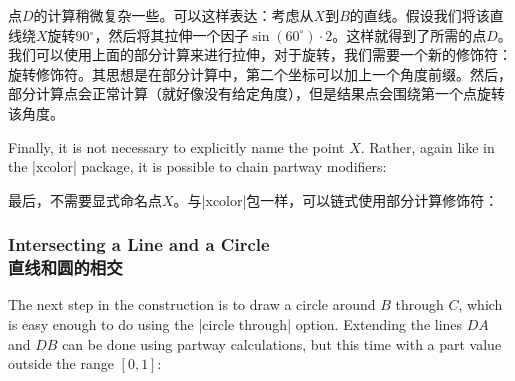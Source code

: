 点$D$的计算稍微复杂一些。可以这样表达：考虑从$X$到$B$的直线。假设我们将该直线绕$X$旋转90$^\circ$，然后将其拉伸一个因子$\sin(60^\circ) \cdot 2$。这样就得到了所需的点$D$。我们可以使用上面的部分计算来进行拉伸，对于旋转，我们需要一个新的修饰符：旋转修饰符。其思想是在部分计算中，第二个坐标可以加上一个角度前缀。然后，部分计算点会正常计算（就好像没有给定角度），但是结果点会围绕第一个点旋转该角度。

\begin{codeexample}[preamble={\usetikzlibrary{calc}}]
\end{codeexample}

Finally, it is not necessary to explicitly name the point $X$. Rather, again
like in the |xcolor| package, it is possible to chain partway modifiers:

最后，不需要显式命名点$X$。与|xcolor|包一样，可以链式使用部分计算修饰符：

%
\begin{codeexample}[preamble={\usetikzlibrary{calc}}]
\end{codeexample}



\subsubsection{Intersecting a Line and a Circle\\直线和圆的相交}

The next step in the construction is to draw a circle around $B$ through $C$,
which is easy enough to do using the |circle through| option. Extending the
lines $DA$ and $DB$ can be done using partway calculations, but this time with
a part value outside the range $[0,1]$:

